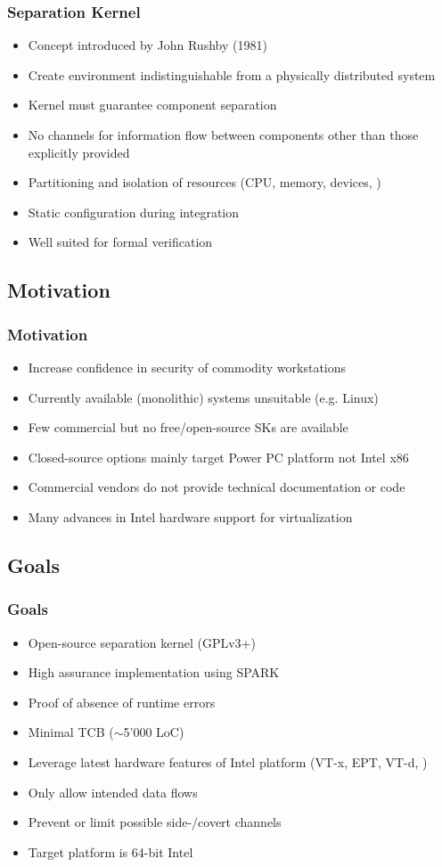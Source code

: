 \documentclass[xcolor={dvipsnames}]{beamer}
\begin{document}
\begin{frame}\frametitle{Separation Kernel}
\begin{itemize}
	\item Concept introduced by John Rushby (1981)
	\item Create environment indistinguishable from a physically distributed system
	\item Kernel must guarantee component separation
	\item No channels for information flow between components other than those explicitly provided
	\item Partitioning and isolation of resources (CPU, memory, devices, \textellipsis)
	\item Static configuration during integration
	\item Well suited for formal verification
\end{itemize}
\end{frame}

\subsection{Motivation}
\begin{frame}\frametitle{Motivation}
\begin{itemize}
	\item Increase confidence in security of commodity workstations
	\item Currently available (monolithic) systems unsuitable (e.g. Linux)
	\item Few commercial but no free/open-source SKs are available
	\item Closed-source options mainly target Power PC platform not Intel x86
	\item Commercial vendors do not provide technical documentation or code
	\item Many advances in Intel hardware support for virtualization
\end{itemize}
\end{frame}

\subsection{Goals}
\begin{frame}\frametitle{Goals}
\begin{itemize}
	\item Open-source separation kernel (GPLv3+)
	\item High assurance implementation using SPARK
	\item Proof of absence of runtime errors
	\item Minimal TCB ($\sim$5'000 LoC)
	\item Leverage latest hardware features of Intel platform (VT-x, EPT, VT-d, \textellipsis)
	\item Only allow intended data flows
	\item Prevent or limit possible side-/covert channels
	\item Target platform is 64-bit Intel
\end{itemize}
\end{frame}
\end{document}
